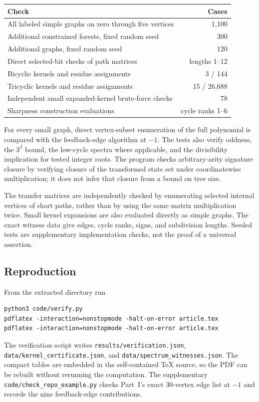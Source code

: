 \documentclass[11pt]{article}
\numberwithin{equation}{section}
\theoremstyle{definition}
\begin{document}
\begin{center}
\begin{tabular}{p{.66\linewidth}r}
\toprule
Check & Cases\\\midrule
All labeled simple graphs on zero through five vertices & 1,100\\
Additional constrained forests, fixed random seed & 300\\
Additional graphs, fixed random seed & 120\\
Direct selected-bit checks of path matrices & lengths 1--12\\
Bicyclic kernels and residue assignments & 3 / 144\\
Tricyclic kernels and residue assignments & 15 / 26,688\\
Independent small expanded-kernel brute-force checks & 78\\
Sharpness construction evaluations & cycle ranks 1--6\\
\bottomrule
\end{tabular}
\end{center}

For every small graph, direct vertex-subset enumeration of the full
polynomial is compared with the feedback-edge algorithm at $-1$.
The tests also verify oddness, the $3^\beta$ bound, the low-cycle spectra
where applicable, and the divisibility implication for tested integer
roots. The program checks arbitrary-arity signature closure by verifying
closure of the transformed state set under coordinatewise multiplication;
it does not infer that closure from a bound on tree size.

The transfer matrices are independently checked by enumerating selected
internal vertices of short paths, rather than by using the same matrix
multiplication twice. Small kernel expansions are also evaluated directly
as simple graphs. The exact witness data give edges, cycle ranks, signs,
and subdivision lengths. Seeded tests are supplementary implementation
checks, not the proof of a universal assertion.

\subsection{Reproduction}\label{cb:sec:reproduction}
From the extracted directory run
\begin{lstlisting}
python3 code/verify.py
pdflatex -interaction=nonstopmode -halt-on-error article.tex
pdflatex -interaction=nonstopmode -halt-on-error article.tex
\end{lstlisting}
The verification script writes \texttt{results/verification.json},
\texttt{data/kernel\_certificate.json}, and
\texttt{data/spectrum\_witnesses.json}. The compact tables are embedded in the self-contained TeX source, so the
PDF can be rebuilt without rerunning the computation.
The supplementary \texttt{code/check\_repo\_example.py} checks
Part~I's exact 30-vertex edge list at $-1$ and records the nine
feedback-edge contributions.
\end{document}
